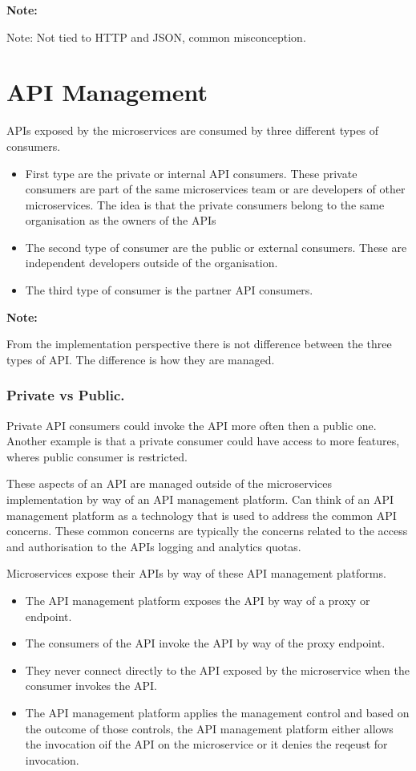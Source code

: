 \documentclass[a4paper, 11pt]{book}
\newenvironment{note}{
    \begin{siderule}
        \textbf{Note: }
        }{
    \end{siderule}
}
\begin{document}
    \begin{note}
        Note: Not tied to HTTP and JSON, common misconception.
    \end{note}


    \section{API Management}
    APIs exposed by the microservices are consumed by three different types of consumers.
    \begin{itemize}
        \item First type are the private or internal API consumers. These private consumers are part of the same microservices team or are developers of other microservices. The idea is that the private consumers belong to the same organisation as the owners of the APIs
        \item The second type of consumer are the public or external consumers. These are independent developers outside of the organisation.
        \item The third type of consumer is the partner API consumers.
    \end{itemize}

    \begin{note}
        From the implementation perspective there is not difference between the three types of API.
        The difference is how they are managed.
    \end{note}

    \subsubsection{Private vs Public.}
    Private API consumers could invoke the API more often then a public one.
    Another example is that a private consumer could have access to more features, wheres public consumer is restricted.

    These aspects of an API are managed outside of the microservices implementation by way of an API management platform.
    Can think of an API management platform as a technology that is used to address the common API concerns.
    These common concerns are typically the concerns related to the access and authorisation to the APIs logging and analytics quotas.

    Microservices expose their APIs by way of these API management platforms.
    \begin{itemize}
        \item The API management platform exposes the API by way of a proxy or endpoint.
        \item The consumers of the API invoke the API by way of the proxy endpoint.
        \item They never connect directly to the API exposed by the microservice when the consumer invokes the API.
        \item The API management platform applies the management control and based on the outcome of those controls, the API management platform either allows the invocation oif the API on the microservice or it denies the reqeust for invocation.
    \end{itemize}
\end{document}
